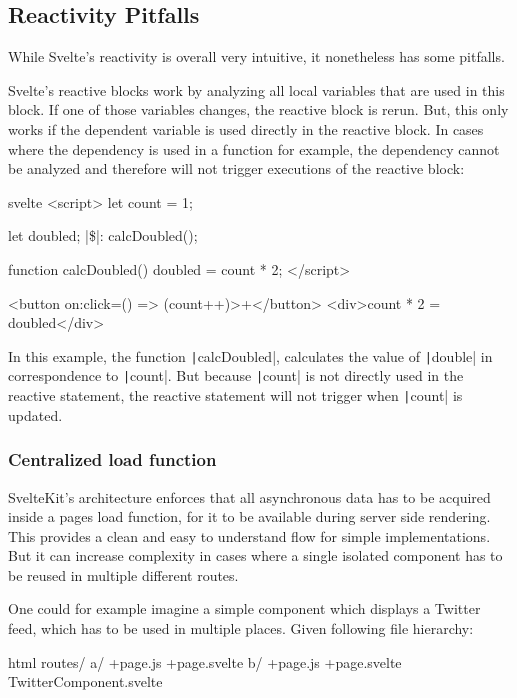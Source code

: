 \subsection{Reactivity Pitfalls}

While Svelte's reactivity is overall very intuitive, it nonetheless has some pitfalls. 

Svelte's reactive blocks work by analyzing all local variables that are used in this block. If one of those variables changes, the reactive block is rerun. But, this only works if the dependent variable is used directly in the reactive block. In cases where the dependency is used in a function for example, the dependency cannot be analyzed and therefore will not trigger executions of the reactive block:

\begin{myminted}[escapeinside=||]{svelte}{}
<script>
    let count = 1;

    let doubled;
    |\$|: calcDoubled();

    function calcDoubled() {
        doubled = count * 2;
    }
</script> 

<button on:click={() => (count++)}>+</button>
<div>{count} * 2 = {doubled}</div>
\end{myminted}

In this example, the function \texttt|calcDoubled|, calculates the value of \texttt|double| in correspondence to \texttt|count|. But because \texttt|count| is not directly used in the reactive statement, the reactive statement will not trigger when \texttt|count| is updated.

\subsubsection{Centralized load function} 

SvelteKit's architecture enforces that all asynchronous data has to be acquired inside a pages load function, for it to be available during server side rendering. This provides a clean and easy to understand flow for simple implementations. But it can increase complexity in cases where a single isolated component has to be reused in multiple different routes. 

One could for example imagine a simple component which displays a Twitter feed, which has to be used in multiple places. Given following file hierarchy: 

\begin{myminted}{html}{}
routes/
    a/
        +page.js
        +page.svelte
    b/
        +page.js
        +page.svelte
    TwitterComponent.svelte
\end{myminted}

